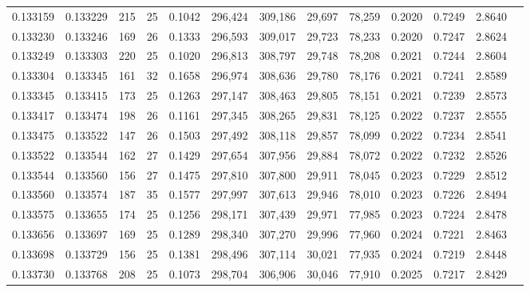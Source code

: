 \begin{tabular}{rrrrrrrrrrrrr}
0.133159 & 0.133229 & 215 &  25 &                                     0.1042 & 296,424 & 309,186 &  29,697 &  78,259 & 0.2020 & 0.7249 & 2.8640 \\
0.133230 & 0.133246 & 169 &  26 &                                     0.1333 & 296,593 & 309,017 &  29,723 &  78,233 & 0.2020 & 0.7247 & 2.8624 \\
0.133249 & 0.133303 & 220 &  25 &                                     0.1020 & 296,813 & 308,797 &  29,748 &  78,208 & 0.2021 & 0.7244 & 2.8604 \\
0.133304 & 0.133345 & 161 &  32 &                                     0.1658 & 296,974 & 308,636 &  29,780 &  78,176 & 0.2021 & 0.7241 & 2.8589 \\
0.133345 & 0.133415 & 173 &  25 &                                     0.1263 & 297,147 & 308,463 &  29,805 &  78,151 & 0.2021 & 0.7239 & 2.8573 \\
0.133417 & 0.133474 & 198 &  26 &                                     0.1161 & 297,345 & 308,265 &  29,831 &  78,125 & 0.2022 & 0.7237 & 2.8555 \\
0.133475 & 0.133522 & 147 &  26 &                                     0.1503 & 297,492 & 308,118 &  29,857 &  78,099 & 0.2022 & 0.7234 & 2.8541 \\
0.133522 & 0.133544 & 162 &  27 &                                     0.1429 & 297,654 & 307,956 &  29,884 &  78,072 & 0.2022 & 0.7232 & 2.8526 \\
0.133544 & 0.133560 & 156 &  27 &                                     0.1475 & 297,810 & 307,800 &  29,911 &  78,045 & 0.2023 & 0.7229 & 2.8512 \\
0.133560 & 0.133574 & 187 &  35 &                                     0.1577 & 297,997 & 307,613 &  29,946 &  78,010 & 0.2023 & 0.7226 & 2.8494 \\
0.133575 & 0.133655 & 174 &  25 &                                     0.1256 & 298,171 & 307,439 &  29,971 &  77,985 & 0.2023 & 0.7224 & 2.8478 \\
0.133656 & 0.133697 & 169 &  25 &                                     0.1289 & 298,340 & 307,270 &  29,996 &  77,960 & 0.2024 & 0.7221 & 2.8463 \\
0.133698 & 0.133729 & 156 &  25 &                                     0.1381 & 298,496 & 307,114 &  30,021 &  77,935 & 0.2024 & 0.7219 & 2.8448 \\
0.133730 & 0.133768 & 208 &  25 &                                     0.1073 & 298,704 & 306,906 &  30,046 &  77,910 & 0.2025 & 0.7217 & 2.8429 \\

\end{tabular}

